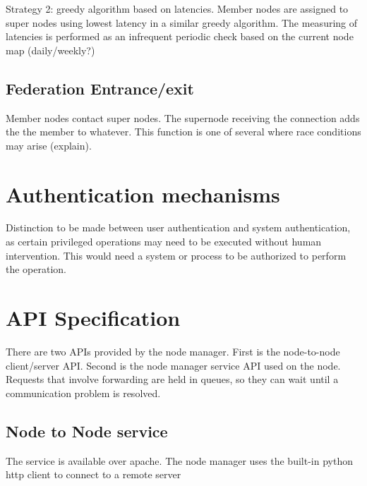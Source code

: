 \documentclass[oneside,12pt]{memoir}
\begin{document}
Strategy 2:  greedy algorithm based on latencies.  Member nodes are assigned to super nodes using lowest latency in a similar greedy algorithm.  The measuring of latencies is performed as an infrequent periodic check based on the current node map (daily/weekly?)

\subsection{Federation Entrance/exit}
Member nodes contact super nodes.  The supernode receiving the connection adds the the member to whatever.  This function is one of several where race conditions may arise (explain).


\section{Authentication mechanisms}
Distinction to be made between user authentication and system authentication, as certain privileged operations may need to be executed without human intervention. This would need a system or process to be authorized to perform the operation. 




\section{API Specification}

There are two APIs provided by the node manager.  First is the node-to-node client/server API.  Second is the node manager service API used on the node.  Requests that involve forwarding are held in queues, so they can wait until a communication problem is resolved. 

\subsection{Node to Node service}

The service is available over apache. The node manager uses the built-in python http client to connect to a remote server
\end{document}
